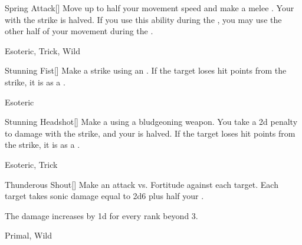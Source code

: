 \lowercase{\hypertarget{maneuver:Spring Attack}{}}\label{maneuver:Spring Attack}
\hypertarget{maneuver:Spring Attack}{}
\begin{freeability}[Rank 3]{Spring Attack}[]
Move up to half your movement speed and make a melee .
Your  with the strike is halved.
If you use this ability during the , you may use the other half of your movement during the .


 Esoteric, Trick, Wild
\end{freeability}
\vspace{0.25em}



\lowercase{\hypertarget{maneuver:Stunning Fist}{}}\label{maneuver:Stunning Fist}
\hypertarget{maneuver:Stunning Fist}{}
\begin{freeability}[Rank 3]{Stunning Fist}[]
Make a strike using an .
If the target loses hit points from the strike, it is  as a .


 Esoteric
\end{freeability}
\vspace{0.25em}



\lowercase{\hypertarget{maneuver:Stunning Headshot}{}}\label{maneuver:Stunning Headshot}
\hypertarget{maneuver:Stunning Headshot}{}
\begin{freeability}[Rank 3]{Stunning Headshot}[]
Make a  using a bludgeoning weapon.
You take a \minus2d penalty to damage with the strike, and your  is halved.
If the target loses hit points from the strike, it is  as a .


 Esoteric, Trick
\end{freeability}
\vspace{0.25em}



\lowercase{\hypertarget{maneuver:Thunderous Shout}{}}\label{maneuver:Thunderous Shout}
\hypertarget{maneuver:Thunderous Shout}{}
\begin{freeability}[Rank 3]{Thunderous Shout}[]
Make an attack vs. Fortitude against each target.
\hit Each target takes sonic damage equal to 2d6 plus half your .

\rankline
The damage increases by \plus1d for every rank beyond 3.


 Primal, Wild
\end{freeability}
\vspace{0.25em}



